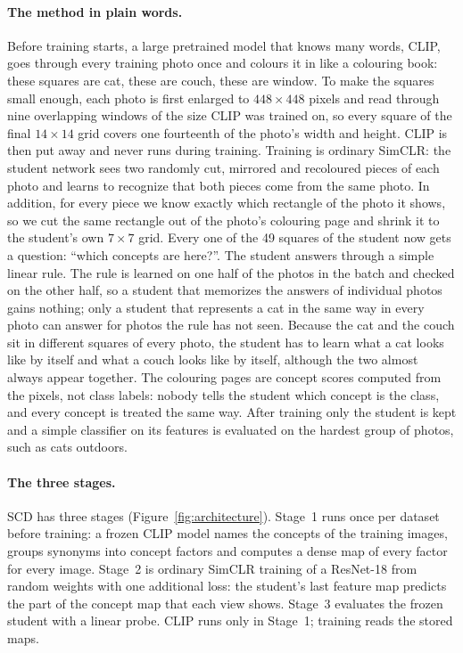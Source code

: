 \documentclass{article}
\begin{document}
\paragraph{The method in plain words.} Before training starts, a large pretrained model that knows many words, CLIP, goes through every training photo once and colours it in like a colouring book: these squares are cat, these are couch, these are window. To make the squares small enough, each photo is first enlarged to $448\times448$ pixels and read through nine overlapping windows of the size CLIP was trained on, so every square of the final $14\times14$ grid covers one fourteenth of the photo's width and height. CLIP is then put away and never runs during training. Training is ordinary SimCLR: the student network sees two randomly cut, mirrored and recoloured pieces of each photo and learns to recognize that both pieces come from the same photo. In addition, for every piece we know exactly which rectangle of the photo it shows, so we cut the same rectangle out of the photo's colouring page and shrink it to the student's own $7\times7$ grid. Every one of the 49 squares of the student now gets a question: ``which concepts are here?''. The student answers through a simple linear rule. The rule is learned on one half of the photos in the batch and checked on the other half, so a student that memorizes the answers of individual photos gains nothing; only a student that represents a cat in the same way in every photo can answer for photos the rule has not seen. Because the cat and the couch sit in different squares of every photo, the student has to learn what a cat looks like by itself and what a couch looks like by itself, although the two almost always appear together. The colouring pages are concept scores computed from the pixels, not class labels: nobody tells the student which concept is the class, and every concept is treated the same way. After training only the student is kept and a simple classifier on its features is evaluated on the hardest group of photos, such as cats outdoors.

\paragraph{The three stages.} SCD has three stages (Figure~\ref{fig:architecture}). Stage~1 runs once per dataset before training: a frozen CLIP model names the concepts of the training images, groups synonyms into concept factors and computes a dense map of every factor for every image. Stage~2 is ordinary SimCLR training of a ResNet-18 from random weights with one additional loss: the student's last feature map predicts the part of the concept map that each view shows. Stage~3 evaluates the frozen student with a linear probe. CLIP runs only in Stage~1; training reads the stored maps.
\end{document}

